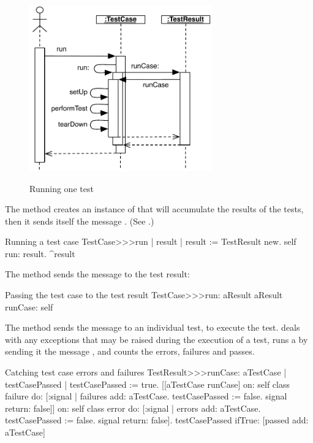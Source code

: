 \documentclass[a4paper,10pt,twoside]{book}
\begin{document}
\begin{figure}[tbh]
  \begin{center}
		{\includegraphics[width=0.7\textwidth]{sunit-scenario}}
	\caption{Running one test}
  \end{center}
\end{figure}

The method  creates an instance of
 that will accumulate the results of the
tests, then it sends itself the message .
(See .)

\begin{method}[tastecaserun]{Running a test case}
TestCase>>>run
	| result |
	result := TestResult new.
	self run: result.
	^result
\end{method}


The method
 sends the message
 to the test result:

\begin{method}[testcaserun:]{Passing the test case to the test result}
TestCase>>>run: aResult
	aResult runCase: self
\end{method}
The method  sends
the message  to an individual test, to execute the test.
 deals with 
any exceptions that may be raised during the
execution of a test, runs a  by sending it the
message , and counts the errors, failures
and passes.
\begin{method}[testresultruncase]{Catching test case errors and failures}
TestResult>>>runCase: aTestCase
	| testCasePassed |
	testCasePassed := true.
	[[aTestCase runCase] 
			on: self class failure
			do: 
				[:signal | 
				failures add: aTestCase.
				testCasePassed := false.
				signal return: false]]
					on: self class error
					do:
						[:signal |
						errors add: aTestCase.
						testCasePassed := false.
						signal return: false].
	testCasePassed ifTrue: [passed add: aTestCase]
\end{method}
\end{document}
